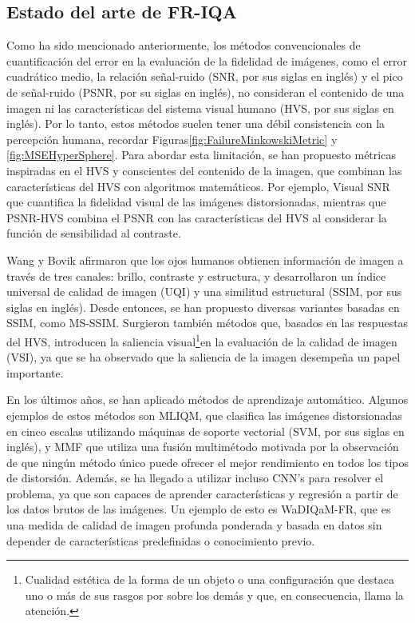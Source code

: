 \subsection{Estado del arte de FR-IQA}
Como ha sido mencionado anteriormente, los métodos convencionales de cuantificación del error en la evaluación de la fidelidad 
de imágenes, como el error cuadrático medio, la relación señal-ruido (SNR, por sus siglas en inglés) y el pico de señal-ruido (PSNR, por su siglas en inglés), 
no consideran el contenido de una imagen ni las características del sistema visual 
humano (HVS, por sus siglas en inglés). Por lo tanto, estos métodos suelen tener 
una débil consistencia con la percepción humana, recordar Figuras\ref{fig:FailureMinkowskiMetric} y \ref{fig:MSEHyperSphere}. 
Para abordar esta limitación, se han propuesto métricas inspiradas en el HVS y 
conscientes del contenido de la imagen, que combinan las características del HVS con algoritmos matemáticos. 
Por ejemplo, Visual SNR\cite{VSNR} que cuantifica la fidelidad visual de las imágenes 
distorsionadas, mientras que PSNR-HVS\cite{PSNR-HVS} combina el PSNR con las 
características del HVS al considerar la función de sensibilidad al contraste. 

Wang y Bovik afirmaron que los ojos humanos obtienen información de imagen a través de tres canales: brillo, contraste y estructura\cite{SSIM}, 
y desarrollaron un índice universal de calidad de imagen (UQI)\cite{UQI} y una similitud estructural (SSIM, por sus siglas en inglés)\cite{SSIM}.
Desde entonces, se han propuesto diversas variantes basadas en SSIM, como MS-SSIM\cite{MS-SSIM}.
Surgieron también métodos que, basados en las respuestas del HVS, introducen la 
saliencia visual\footnote{
  Cualidad estética de la forma de un objeto o una configuración que destaca uno o más de sus rasgos por sobre los demás y que, en consecuencia, llama la atención.
}en la evaluación de la calidad de imagen (VSI)\cite{VSI}, 
ya que se ha observado que la saliencia de la imagen desempeña un papel importante.

En los últimos años, se han aplicado métodos de aprendizaje automático. 
Algunos ejemplos de estos métodos son MLIQM\cite{MLIQM}, que clasifica las imágenes distorsionadas en 
cinco escalas utilizando máquinas de soporte vectorial (SVM, por sus siglas en inglés), y MMF\cite{MMF} que utiliza 
una fusión multimétodo motivada por la observación de que ningún método único puede ofrecer 
el mejor rendimiento en todos los tipos de distorsión.
Además, se ha llegado a utilizar incluso CNN's para resolver el problema, ya que son capaces de aprender características 
y regresión a partir de los datos brutos de las imágenes. Un ejemplo de esto es 
WaDIQaM-FR\cite{DIQaM}, que es una medida de calidad de imagen profunda ponderada y 
basada en datos sin depender de características predefinidas o conocimiento previo.

